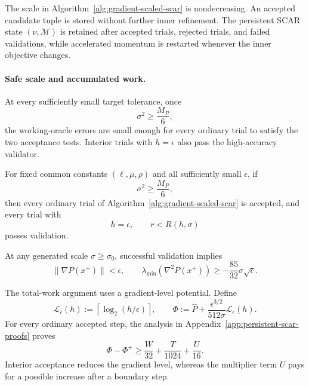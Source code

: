 The scale in Algorithm~\ref{alg:gradient-scaled-scar} is
nondecreasing. An accepted candidate tuple is stored without further
inner refinement. The persistent SCAR state $(\nu,\mathcal M)$ is
retained after accepted trials, rejected trials, and failed
validations, while accelerated momentum is restarted whenever the
inner objective changes.


\paragraph{Safe scale and accumulated work.}

At every sufficiently small target tolerance, once
\[
    \sigma^2\ge\frac{M_P}{6},
\]
the working-oracle errors are small enough for every ordinary trial
to satisfy the two acceptance tests. Interior trials with
$h=\epsilon$ also pass the high-accuracy validator.

\begin{lemma}
\label{lem:gs-safe}
For fixed common constants $(\ell,\mu,\rho)$ and all sufficiently
small $\epsilon$, if
\[
    \sigma^2\ge\frac{M_P}{6},
\]
then every ordinary trial of
Algorithm~\ref{alg:gradient-scaled-scar} is accepted, and every
trial with
\[
    h=\epsilon,
    \qquad
    r<R(h,\sigma)
\]
passes validation.

At any generated scale $\sigma\ge\sigma_0$, successful validation
implies
\begin{equation}
    \|\nabla P(x^+)\|<\epsilon,
    \qquad
    \lambda_{\min}(\nabla^2P(x^+))
    \ge
    -\frac{85}{32}\sigma\sqrt\epsilon.
    \label{eq:gs-validator-return}
\end{equation}
\end{lemma}

The total-work argument uses a gradient-level potential. Define
\begin{equation}
    \mathcal L_\epsilon(h)
    :=
    \left\lceil
        \log_2(h/\epsilon)
    \right\rceil,
    \qquad
    \Phi
    :=
    \widehat P
    +
    \frac{\epsilon^{3/2}}{512\sigma}
    \mathcal L_\epsilon(h).
    \label{eq:gs-potential}
\end{equation}
For every ordinary accepted step, the analysis in
Appendix~\ref{app:persistent-scar-proofs} proves
\begin{equation}
    \Phi-\Phi^+
    \ge
    \frac{W}{32}
    +
    \frac{T}{1024}
    +
    \frac{U}{16}.
    \label{eq:gs-potential-decrease}
\end{equation}
Interior acceptance reduces the gradient level, whereas the
multiplier term $U$ pays for a possible increase after a boundary
step.

